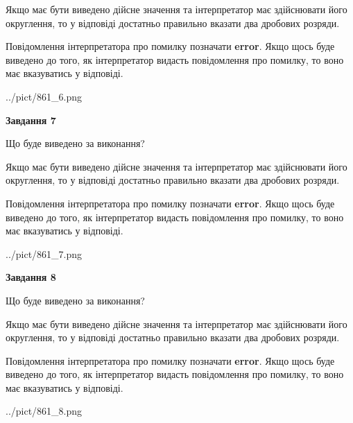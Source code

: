 \documentclass[12pt, ukrainian]{article}
\begin{document}
{\begin {Large}
Якщо має бути виведено дійсне значення та інтерпретатор має здійснювати його округлення, 
то у відповіді достатньо правильно вказати два дробових розряди.

Повідомлення інтерпретатора про помилку позначати \textbf{error}.
Якщо щось буде виведено до того, як інтерпретатор видасть повідомлення про помилку, 
то воно має вказуватись у відповіді. \par

\begin{center}
	{../pict/861_6.png}
\end{center}
\newpage

{\begin {center}\textbf{Завдання 7}\end {center}}\par
Що буде виведено за виконання? \par

Якщо має бути виведено дійсне значення та інтерпретатор має здійснювати його округлення, 
то у відповіді достатньо правильно вказати два дробових розряди.

Повідомлення інтерпретатора про помилку позначати \textbf{error}.
Якщо щось буде виведено до того, як інтерпретатор видасть повідомлення про помилку, 
то воно має вказуватись у відповіді. \par

\begin{center}
	{../pict/861_7.png}
\end{center}
\newpage

{\begin {center}\textbf{Завдання 8}\end {center}}\par
Що буде виведено за виконання? \par

Якщо має бути виведено дійсне значення та інтерпретатор має здійснювати його округлення, 
то у відповіді достатньо правильно вказати два дробових розряди.

Повідомлення інтерпретатора про помилку позначати \textbf{error}.
Якщо щось буде виведено до того, як інтерпретатор видасть повідомлення про помилку, 
то воно має вказуватись у відповіді. \par

\begin{center}
	{../pict/861_8.png}
\end{center}
\newpage


\end{Large}}
\end{document}

